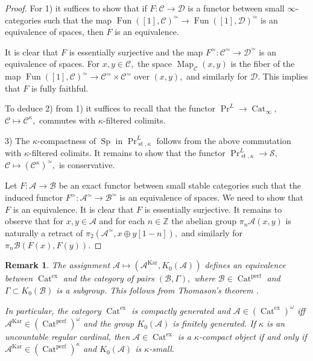 \documentclass[11pt,leqno]{amsart}
\newtheorem{remark}[theo]{Remark}
\numberwithin{equation}{section}
\def\Z{\mathbb{Z}}
\def\Map{\operatorname{Map}}
\newcommand{\Cat}{\operatorname{Cat}}
\newcommand{\ex}{\operatorname{ex}}
\newcommand{\st}{\operatorname{st}}
\newcommand{\cD}{{\mathcal D}}
\newcommand{\cA}{{\mathcal A}}
\newcommand{\cB}{{\mathcal B}}
\newcommand{\cC}{{\mathcal C}}
\newcommand{\cS}{{\mathcal S}}
\newcommand{\Fun}{\operatorname{Fun}}
\newcommand{\perf}{\operatorname{perf}}
\newcommand{\Kar}{\operatorname{Kar}}
\newcommand{\Sp}{\operatorname{Sp}}
\begin{document}
\begin{proof}For 1) it suffices to show that if $F:\cC\to\cD$ is a functor between small $\infty$-categories such that the map $\Fun([1],\cC)^{\simeq}\to\Fun([1],\cD)^{\simeq}$ is an equivalence of spaces, then $F$ is an equivalence.

It is clear that $F$ is essentially surjective and the map $F^{\simeq}:\cC^{\simeq}\to\cD^{\simeq}$ is an equivalence of spaces. For $x,y\in\cC,$ the space $\Map_{\cC}(x,y)$ is the fiber of the map $\Fun([1],\cC)^{\simeq}\to\cC^{\simeq}\times\cC^{\simeq}$ over $(x,y),$ and similarly for $\cD.$ This implies that $F$ is fully faithful. 

To deduce 2) from 1) it suffices to recall that the functor $\Pr^L\to \Cat_{\infty},$ $\cC\mapsto\cC^{\kappa},$ commutes with $\kappa$-filtered colimits.

3) The $\kappa$-compactness of $\Sp$ in $\Pr^L_{\st,\kappa}$ follows from the above commutation with $\kappa$-filtered colimits. It remains to show that the functor $\Pr^L_{\st,\kappa}\to\cS,$ $\cC\mapsto (\cC^{\kappa})^{\simeq},$ is conservative.

Let $F:\cA\to\cB$ be an exact functor between small stable categories such that the induced functor $F^{\simeq}:\cA^{\simeq}\to\cB^{\simeq}$ is an equivalence of spaces. We need to show that $F$ is an equivalence. It is clear that $F$ is essentially surjective. It remains to observe that for $x,y\in\cA$ and for each $n\in\Z$ the abelian group $\pi_n\cA(x,y)$ is naturally a retract of $\pi_2(\cA^{\simeq},x\oplus y[1-n]),$ and similarly for $\pi_n\cB(F(x),F(y)).$
\end{proof}

\begin{remark}\label{rem:Cat_ex_via_Thomason} The assignment $\cA\mapsto (\cA^{\Kar},K_0(\cA))$ defines an equivalence between $\Cat^{\ex}$ and the category of pairs $(\cB,\Gamma),$ where $\cB\in\Cat^{\perf}$ and $\Gamma\subset K_0(\cB)$ is a subgroup. This follows from Thomason's theorem \cite[Theorem 2.1]{Th}. 

In particular, the category $\Cat^{\ex}$ is compactly generated and $\cA\in (\Cat^{\ex})^{\omega}$ iff $\cA^{\Kar}\in (\Cat^{\perf})^{\omega}$ and the group $K_0(\cA)$ is finitely generated.
If $\kappa$ is an uncountable regular cardinal, then $\cA\in\Cat^{\ex}$ is a $\kappa$-compact object if and only if $\cA^{\Kar}\in (\Cat^{\perf})^{\kappa}$ and $K_0(\cA)$ is $\kappa$-small.\end{remark}
\end{document}
